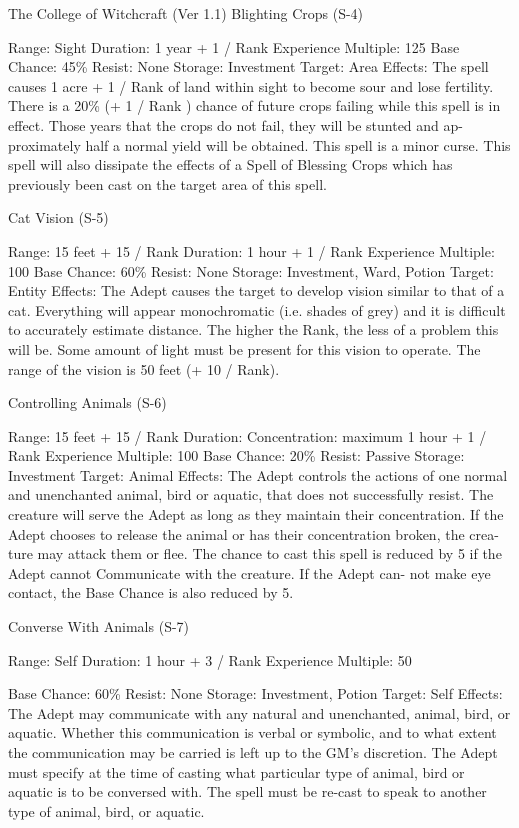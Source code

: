 \begin{Chapter}{The College of Witchcraft (Ver 1.1)}
Blighting Crops (S-4) 

Range: Sight 
Duration: 1 year + 1 / Rank 
Experience Multiple: 125 
Base Chance: 45\% 
Resist: None 
Storage: Investment 
Target: Area 
Effects: The spell causes 1 acre + 1 / Rank of land 
within  sight  to  become  sour  and  lose  fertility. 
There is a 20\% (+ 1 / Rank ) chance of future crops 
failing while this spell is in effect. Those years that 
the  crops  do  not  fail,  they  will  be  stunted  and  ap-
proximately  half  a  normal  yield  will  be  obtained. 
This  spell  is  a  minor  curse.  This  spell  will  also 
dissipate  the  effects  of  a  Spell  of  Blessing  Crops 
which  has  previously  been  cast  on  the  target  area 
of this spell. 

Cat Vision (S-5) 

Range: 15 feet + 15 / Rank 
Duration: 1 hour + 1 / Rank 
Experience Multiple: 100 
Base Chance: 60\% 
Resist: None 
Storage: Investment, Ward, Potion 
Target: Entity 
Effects:  The  Adept  causes  the  target  to  develop 
vision  similar  to  that  of  a  cat.  Everything  will 
appear  monochromatic  (i.e.  shades  of  grey)  and  it 
is  difficult  to  accurately  estimate  distance.  The 
higher the Rank, the less of a problem this will be. 
Some  amount  of  light  must  be  present  for  this 
vision to operate. The range of the vision is 50 feet 
(+ 10 / Rank). 

Controlling Animals (S-6) 

Range: 15 feet + 15 / Rank 
Duration:  Concentration:  maximum  1  hour  +  1  / 
Rank 
Experience Multiple: 100 
Base Chance: 20\% 
Resist: Passive 
Storage: Investment 
Target: Animal 
Effects:  The  Adept  controls  the  actions  of  one 
normal  and  unenchanted  animal,  bird  or  aquatic, 
that  does  not  successfully  resist.  The  creature  will 
serve  the  Adept  as  long  as  they  maintain  their 
concentration.  If  the  Adept  chooses  to  release  the 
animal or has their concentration broken, the crea-
ture  may  attack  them  or  flee.  The  chance  to  cast 
this  spell  is  reduced  by  5  if  the  Adept  cannot 
Communicate  with  the  creature.  If  the  Adept  can-
not  make  eye  contact,  the  Base  Chance  is  also 
reduced by 5. 

Converse With Animals (S-7) 

Range: Self 
Duration: 1 hour + 3 / Rank 
Experience Multiple: 50 

Base Chance: 60\% 
Resist: None 
Storage: Investment, Potion 
Target: Self 
Effects:  The  Adept  may  communicate  with  any 
natural  and  unenchanted,  animal,  bird,  or  aquatic. 
Whether this communication is verbal or symbolic, 
and  to  what  extent  the  communication  may  be 
carried is left up to the GM’s discretion. The Adept 
must specify at the time of casting what particular 
type  of  animal,  bird  or  aquatic  is  to  be  conversed 
with. The spell must be re-cast to speak to another 
type of animal, bird, or aquatic. 


\end{Chapter}
